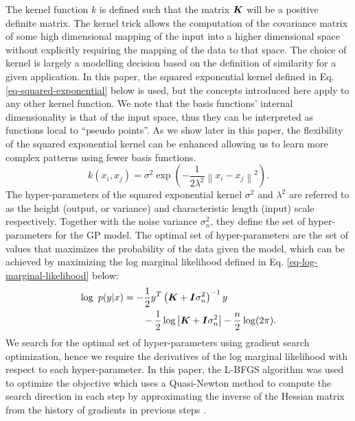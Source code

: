 \documentclass[useAMS,usenatbib,fleqn]{mn2e}
\begin{document}
The kernel function $k$ is defined such that the matrix $\bmath{K}$ will be a positive definite matrix. The kernel trick allows the computation of the covariance matrix of some high dimensional mapping of the input into a higher dimensional space without explicitly requiring the mapping of the data to that space. The choice of kernel is largely a modelling decision based on the definition of similarity for a given application. In this paper, the squared exponential kernel defined in  Eq. \eqref{eq-squared-exponential} below is used, but the concepts introduced here apply to any other kernel function. We note that the basis functions' internal dimensionality is that of the input space, thus they can be interpreted as functions local to ``pseudo points''. As we show later in this paper, the flexibility of the squared exponential kernel can be enhanced allowing us to learn more complex patterns using fewer basis functions.
\begin{equation}
\label{eq-squared-exponential}
k(x_{i},x_{j}) = \sigma^{2} \exp \left ( -\frac{1} {2\lambda^{2}} \left \|x_{i}-x_{j}\right\|^{2}\right ).
\end{equation}
The hyper-parameters of the squared exponential kernel $\sigma^{2}$ and $\lambda^{2}$ are referred to as the height (output, or variance) and characteristic length (input) scale respectively. Together with the noise variance $\sigma_{n}^{2}$, they define the set of hyper-parameters for the GP model. The optimal set of hyper-parameters are the set of values that maximizes the probability of the data given the model, which can be achieved by maximizing the log marginal likelihood defined in Eq. \eqref{eq-log-marginal-likelihood} below:
\begin{align}
\label{eq-log-marginal-likelihood}
\log\text{ }p(y|x) &= -\frac{1}{2}y^{T}\left(\bmath{K}+\bmath{I}\sigma_{n}^{2} \right)^{-1}y \nonumber \\
&\qquad -\frac{1}{2} \log\left | \bmath{K}+\bmath{I}\sigma_{n}^{2}\right|-\frac{n}{2}\log(2\pi).
\end{align}
We search for the optimal set of hyper-parameters using gradient search optimization, hence we require the derivatives of the log marginal likelihood with respect to each hyper-parameter. In this paper, the L-BFGS algorithm was used to optimize the objective which uses a Quasi-Newton method to compute the search direction in each step by approximating the inverse of the Hessian matrix from the history of gradients in previous steps \citep{jorge1980,schmidt2005}.
\end{document}
